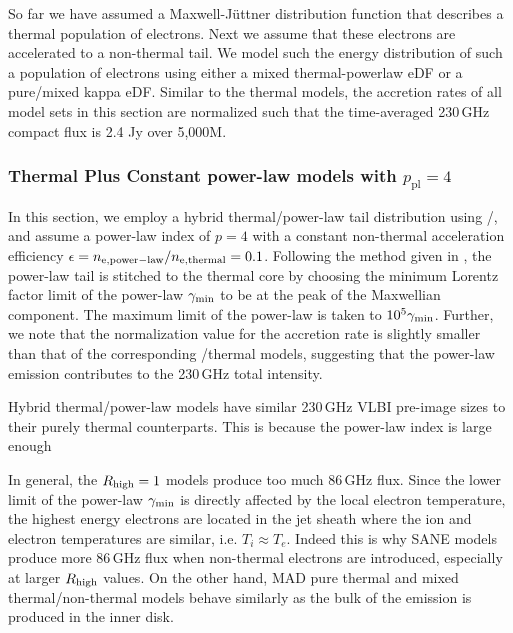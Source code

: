 So far we have assumed a Maxwell-J{\"u}ttner distribution function that describes a thermal population of electrons. Next we assume that these electrons are accelerated to a non-thermal tail. We model such the energy distribution of such a population of electrons using either a mixed thermal-powerlaw eDF or a pure/mixed kappa eDF. Similar to the thermal models, the accretion rates of all model sets in this section are normalized such that the time-averaged 230\,GHz compact flux is 2.4 Jy over 5,000M.

\subsubsection{Thermal Plus Constant power-law models with $p_\mathrm{pl} = 4$}

In this section, we employ a hybrid thermal/power-law tail distribution using \hamr/\bhoss, and assume a power-law index of $p=4$ with a constant non-thermal acceleration efficiency $\epsilon=n_{\rm e, power-law}/n_{\rm e, thermal}=0.1$. Following the method given in \citet{Chatterjee2021}, the power-law tail is stitched to the thermal core by choosing the minimum Lorentz factor limit of the power-law $\gamma_{\rm min}$ to be at the peak of the Maxwellian component. The maximum limit of the power-law is taken to $10^5 \gamma_{\rm min}$. Further, we note that the normalization value for the accretion rate is slightly smaller than that of the corresponding \hamr/\bhoss thermal models, suggesting that the power-law emission contributes to the 230\,GHz total intensity.


Hybrid thermal/power-law models have similar 230\,GHz VLBI pre-image sizes to their purely thermal counterparts. This is because the power-law index is large enough


In general, the $R_{\rm high}=1$ models produce too much 86\,GHz flux. Since the lower limit of the power-law $\gamma_{\rm min}$ is directly affected by the local electron temperature, the highest energy electrons are located in the jet sheath where the ion and electron temperatures are similar, i.e. $T_i\approx T_e$. Indeed this is why SANE models produce more 86\,GHz flux when non-thermal electrons are introduced, especially at larger $R_{\rm high}$ values. On the other hand, MAD pure thermal and mixed thermal/non-thermal models behave similarly as the bulk of the emission is produced in the inner disk.

